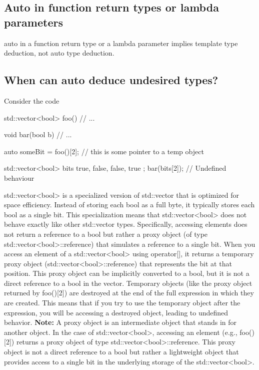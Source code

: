 \documentclass{report}
\begin{document}
\bigbreak \noindent 
\subsection{Auto in function return types or lambda parameters}
\bigbreak \noindent 
auto in a function return type or a lambda parameter implies template type deduction, not auto type deduction.

\bigbreak \noindent 
\subsection{When can auto deduce undesired types?}
\bigbreak \noindent 
Consider the code
\bigbreak \noindent 
\begin{cppcode}
    std::vector<bool> foo() {
        // ...
    }

    void bar(bool b) {
        // ...
    }

    auto someBit = foo()[2]; // this is some pointer to a temp object

    std::vector<bool> bits{ true, false, false, true };
    bar(bits[2]); // Undefined behaviour
\end{cppcode}
\bigbreak \noindent 
std::vector<bool> is a specialized version of std::vector that is optimized for space efficiency. Instead of storing each bool as a full byte, it typically stores each bool as a single bit.
\bigbreak \noindent 
This specialization means that std::vector<bool> does not behave exactly like other std::vector types. Specifically, accessing elements does not return a reference to a bool but rather a proxy object (of type std::vector<bool>::reference) that simulates a reference to a single bit.
\bigbreak \noindent 
When you access an element of a std::vector<bool> using operator[], it returns a temporary proxy object (std::vector<bool>::reference) that represents the bit at that position.
\bigbreak \noindent 
This proxy object can be implicitly converted to a bool, but it is not a direct reference to a bool in the vector.
\bigbreak \noindent 
Temporary objects (like the proxy object returned by foo()[2]) are destroyed at the end of the full expression in which they are created. This means that if you try to use the temporary object after the expression, you will be accessing a destroyed object, leading to undefined behavior.
\bigbreak \noindent 
\textbf{Note:} A proxy object is an intermediate object that stands in for another object. In the case of std::vector<bool>, accessing an element (e.g., foo()[2]) returns a proxy object of type std::vector<bool>::reference. This proxy object is not a direct reference to a bool but rather a lightweight object that provides access to a single bit in the underlying storage of the std::vector<bool>.
\end{document}
